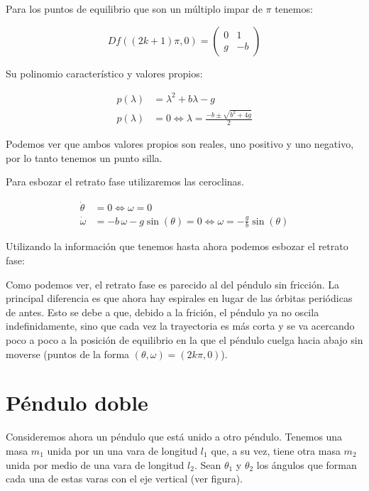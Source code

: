 \documentclass[
]{article}
\begin{document}
Para los puntos de equilibrio que son un múltiplo impar de \(\pi\)
tenemos:

\[
Df((2k+1)\pi, 0) = \begin{pmatrix}
0 & 1 \\
g  & -b
\end{pmatrix}
\]

Su polinomio característico y valores propios:

\[
\begin{aligned}
    p(\lambda) & = \lambda^2 + b \lambda - g \\
    p(\lambda) & = 0 \iff \lambda = \frac{-b \pm \sqrt{b^2+4g}}{2}
\end{aligned}
\]

Podemos ver que ambos valores propios son reales, uno positivo y uno
negativo, por lo tanto tenemos un punto silla.

Para esbozar el retrato fase utilizaremos las ceroclinas.

\[
\begin{aligned}
    \dot{\theta} &= 0 \iff \omega = 0 \\
    \dot{\omega} &= -b \, \omega - g \sin(\theta) = 0  \iff \omega = - \frac{g}{b} \sin(\theta)
\end{aligned}
\]

Utilizando la información que tenemos hasta ahora podemos esbozar el
retrato fase:

Como podemos ver, el retrato fase es parecido al del péndulo sin
fricción. La principal diferencia es que ahora hay espirales en lugar de
las órbitas periódicas de antes. Esto se debe a que, debido a la
frición, el péndulo ya no oscila indefinidamente, sino que cada vez la
trayectoria es más corta y se va acercando poco a poco a la posición de
equilibrio en la que el péndulo cuelga hacia abajo sin moverse (puntos
de la forma \((\theta, \omega) = (2k\pi, 0)\)).

\hypertarget{puxe9ndulo-doble}{%
\section{Péndulo doble}\label{puxe9ndulo-doble}}

Consideremos ahora un péndulo que está unido a otro péndulo. Tenemos una
masa \(m_1\) unida por un una vara de longitud \(l_1\) que, a su vez,
tiene otra masa \(m_2\) unida por medio de una vara de longitud \(l_2\).
Sean \(\theta_1\) y \(\theta_2\) los ángulos que forman cada una de
estas varas con el eje vertical (ver figura).
\end{document}
